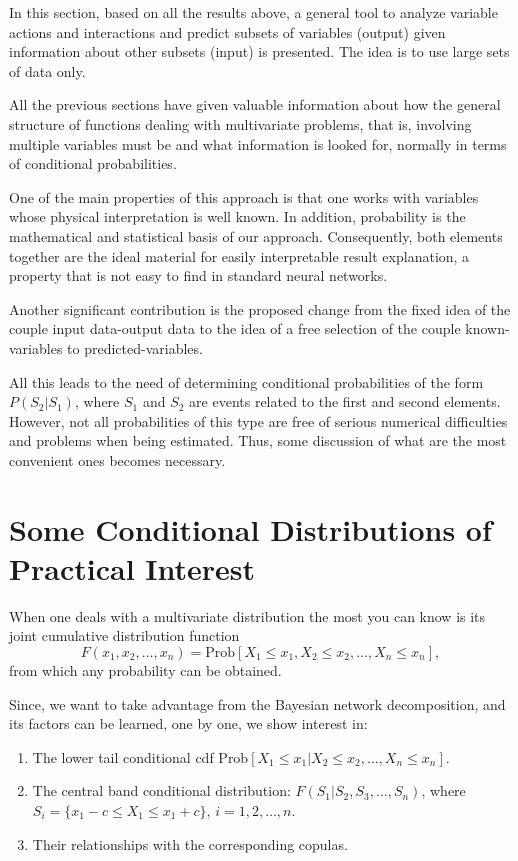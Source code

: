 \documentclass[
	11pt, %
	fleqn, %
	a4paper, %
]{LegrandOrangeBook}
\begin{document}
In this section, based on all the results above, a general tool to analyze variable actions and interactions and predict subsets of variables (output) given information about other subsets (input) is presented. The idea is to use large sets of data only.

All the previous sections have given valuable information about how the general structure of functions dealing with multivariate problems, that is, involving multiple variables must be and what information is looked for, normally in terms of conditional probabilities.

One of the main properties of this approach is that one works with variables whose physical interpretation is well known. In addition, probability is the mathematical and statistical basis of our approach. Consequently, both elements together are the ideal material for easily interpretable result explanation, a property that is not easy to find in standard neural networks.

Another significant contribution is the proposed change from the fixed idea of the couple input data-output data to the idea of a free selection of the couple known-variables to predicted-variables.

All this leads to the need of determining conditional probabilities of the form $P(S_2|S_1)$, where $S_1$ and $S_2$ are events related to the first and second elements. However, not all probabilities of this type are free of serious numerical difficulties and problems when being estimated. Thus, some discussion of what are the most convenient ones becomes necessary.

\section{Some Conditional Distributions of Practical Interest}

When one deals with a multivariate distribution the most you can know is its joint cumulative distribution function
\begin{equation}
F(x_1, x_2,\ldots, x_n) = \text{Prob}[X_1 \leq x_1, X_2 \leq x_2,\ldots, X_n \leq x_n],
\label{eq:jointcdf}
\end{equation}
from which any probability can be obtained.

Since, we want to take advantage from the Bayesian network decomposition, and its factors can be learned, one by one, we show interest in:
\begin{enumerate}
\item The lower tail conditional cdf $\text{Prob}[X_1 \leq x_1|X_2 \leq x_2,\ldots,X_n \leq x_n]$.
\item The central band conditional distribution: $F(S_1|S_2,S_3,\ldots,S_n)$, where $S_i = \{x_1-c \leq X_1 \leq x_1+c\}$, $i = 1,2,\ldots,n$.
\item Their relationships with the corresponding copulas.
\end{enumerate}
\end{document}
